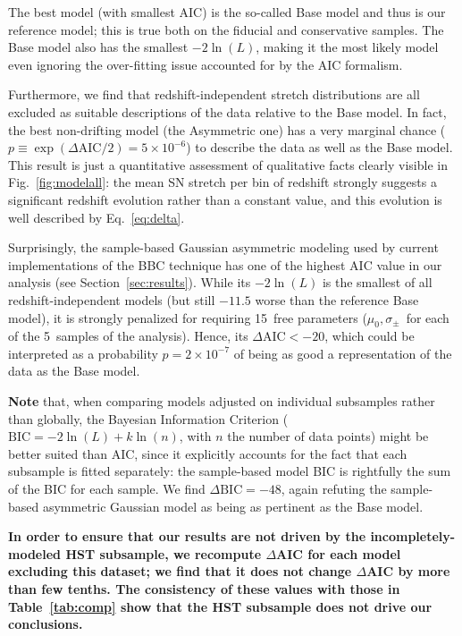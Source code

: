 \documentclass[]{aa}
\begin{document}
The best model (with smallest AIC) is the so-called Base model and thus is our
reference model; this is true both on the fiducial and conservative samples.
The Base model also has the smallest $-2\ln(L)$, making it the most likely
model even ignoring the over-fitting issue accounted for by the AIC formalism.

Furthermore, we find that redshift-independent stretch distributions are all
excluded as suitable descriptions of the data relative to the Base model. In
fact, the best non-drifting model (the Asymmetric one) has a very marginal
chance ($p \equiv \exp\left(\Delta\mathrm{AIC}/2\right) = 5\times10^{-6}$) to
describe the data as well as the Base model. This result is just a quantitative
assessment of qualitative facts clearly visible in Fig.~\ref{fig:modelall}: the
mean SN stretch per bin of redshift strongly suggests a significant redshift
evolution rather than a constant value, and this evolution is well described by
Eq.~\ref{eq:delta}.

Surprisingly, the sample-based Gaussian asymmetric modeling used by current
implementations of the BBC technique \citep{scolnic2016, kessler2017} has one of
the highest AIC value in our analysis (see Section~\ref{sec:results}). While its
$-2\ln(L)$ is the smallest of all redshift-independent models (but still $-11.5$
worse than the reference Base model), it is strongly penalized for requiring
15~free parameters ($\mu_0, \sigma_{\pm}$~for each of the 5~samples of the
analysis). Hence, its $\Delta\mathrm{AIC}<-20$, which could be interpreted as a
probability $p=2\times 10^{-7}$ of being as good a representation of the data
as the Base model.

\textbf{Note} that, when comparing models adjusted on individual subsamples
rather than globally, the Bayesian Information Criterion ($\mathrm{BIC} =
-2\ln(L) + k\ln(n)$, with $n$ the number of data points) might be better suited
than AIC, since it explicitly accounts for the fact that each subsample is
fitted separately: the sample-based model BIC is rightfully the sum of the BIC
for each sample. We find $\Delta\mathrm{BIC}=-48$, again refuting the
sample-based asymmetric Gaussian model as being as pertinent as the Base model.

\textbf{In order to ensure that our results are not driven by the
    incompletely-modeled HST subsample, we recompute $\Delta$AIC for each model
    excluding this dataset; we find that it does not change $\Delta$AIC by more
    than few tenths. The consistency of these values with those in
    Table~\ref{tab:comp} show that the HST subsample does not drive our
conclusions.}
\end{document}
